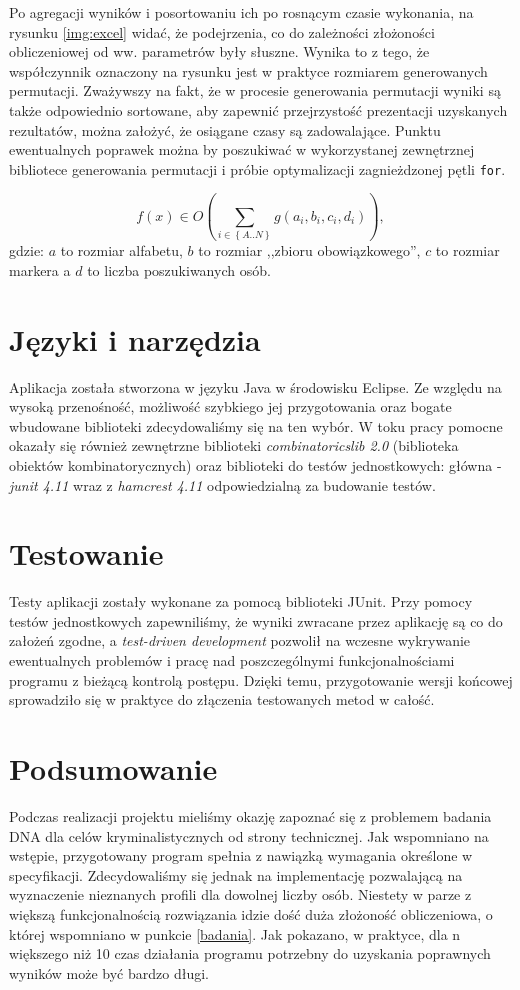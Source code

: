 \documentclass[11pt,a4paper]{article}
\begin{document}
Po agregacji wyników i posortowaniu ich po rosnącym czasie wykonania, na rysunku \ref{img:excel} widać, że podejrzenia, co do zależności złożoności obliczeniowej od ww. parametrów były słuszne. Wynika to z tego, że współczynnik oznaczony na rysunku jest w praktyce rozmiarem generowanych permutacji. Zważywszy na fakt, że w procesie generowania permutacji wyniki są także odpowiednio sortowane, aby zapewnić przejrzystość prezentacji uzyskanych rezultatów, można założyć, że osiągane czasy są zadowalające. Punktu ewentualnych poprawek można by poszukiwać w wykorzystanej zewnętrznej bibliotece generowania permutacji i próbie optymalizacji zagnieżdzonej pętli \texttt{for}. 

\begin{equation}
f(x)\in{O(\sum\limits_{i\in{\left\{A..N\right\}}}g(a_{i},b_{i},c_{i},d_{i}))} ,
\label{eqn:complexity}
\end{equation}
gdzie: $a$ to rozmiar alfabetu, $b$ to rozmiar ,,zbioru obowiązkowego'', $c$ to rozmiar markera a $d$ to liczba poszukiwanych osób.

\section{Języki i narzędzia}
Aplikacja została stworzona w języku Java w środowisku Eclipse\cite{eclipse}. Ze względu na wysoką przenośność, możliwość szybkiego jej przygotowania oraz bogate wbudowane biblioteki zdecydowaliśmy się na ten wybór. W toku pracy pomocne okazały się również zewnętrzne biblioteki \emph{combinatoricslib 2.0}\cite{combi} (biblioteka obiektów kombinatorycznych) oraz biblioteki do testów jednostkowych: główna - \emph{junit 4.11} wraz z \emph{hamcrest 4.11} odpowiedzialną za budowanie testów.

\section{Testowanie}
Testy aplikacji zostały wykonane za pomocą biblioteki JUnit. Przy pomocy testów jednostkowych zapewniliśmy, że wyniki zwracane przez aplikację są co do założeń zgodne, a \emph{test-driven development} pozwolił na wczesne wykrywanie ewentualnych problemów i pracę nad poszczególnymi funkcjonalnościami programu z bieżącą kontrolą postępu. Dzięki temu, przygotowanie wersji końcowej sprowadziło się w praktyce do złączenia testowanych metod w całość.

\section{Podsumowanie}
Podczas realizacji projektu mieliśmy okazję zapoznać się z problemem badania DNA dla celów kryminalistycznych od strony technicznej. Jak wspomniano na wstępie, przygotowany program spełnia z nawiązką wymagania określone w specyfikacji. Zdecydowaliśmy się jednak na implementację pozwalającą na wyznaczenie nieznanych profili dla dowolnej liczby osób. Niestety w parze z większą funkcjonalnością rozwiązania idzie dość duża złożoność obliczeniowa, o której wspomniano w punkcie \ref{badania}. Jak pokazano, w praktyce, dla n większego niż 10 czas działania programu potrzebny do uzyskania poprawnych wyników może być bardzo długi.
\end{document}
